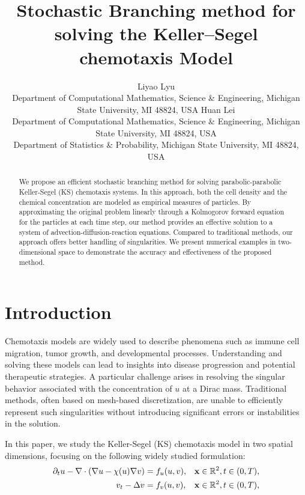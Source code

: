 \documentclass[12pt]{article}
\title{Stochastic Branching method for solving the Keller–Segel chemotaxis Model}
\author{
  Liyao Lyu\\
  Department of Computational Mathematics, Science \& Engineering, Michigan State University, MI 48824, USA
   \And
  Huan Lei\\
  Department of Computational Mathematics, Science \& Engineering, Michigan State University, MI 48824, USA\\
  Department of Statistics \& Probability, Michigan State University, MI 48824, USA}
\begin{document}
\maketitle

\keywords{} 
\begin{abstract}
We propose an efficient stochastic branching method for solving parabolic-parabolic Keller-Segel (KS) chemotaxis systems. In this approach, both the cell density and the chemical concentration are modeled as empirical measures of particles. By approximating the original problem linearly through a Kolmogorov forward equation for the particles at each time step, our method provides an effective solution to a system of advection-diffusion-reaction equations. Compared to traditional methods, our approach offers better handling of singularities. We present numerical examples in two-dimensional space to demonstrate the accuracy and effectiveness of the proposed method.

\end{abstract}


\section{Introduction}
Chemotaxis models are widely used to describe phenomena such as immune cell migration, tumor growth, and developmental processes. Understanding and solving these models can lead to insights into disease progression and potential therapeutic strategies. A particular challenge arises in resolving the singular behavior associated with the concentration of $u$ at a Dirac mass. Traditional methods, often based on mesh-based discretization, are unable to efficiently represent such singularities without introducing significant errors or instabilities in the solution.

In this paper, we study the Keller-Segel (KS) chemotaxis model \cite{keller1970initiation, patlak1953random} in two spatial dimensions, focusing on the following widely studied formulation:
\begin{equation}\label{equ:KS}
\begin{aligned}
\partial_t u - \nabla \cdot ( \nabla u - \chi(u) \nabla v) &= f_u(u,v), & \mathbf{x}\in \mathbb{R}^2 , t\in(0,T), \\
v_t - \Delta v &= f_v(u,v), & \mathbf{x}\in \mathbb{R}^2 , t\in(0,T),
\end{aligned}
\end{equation}
\end{document}
